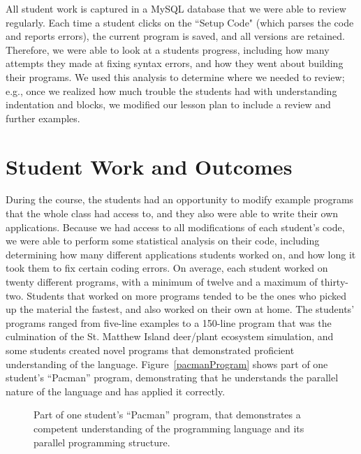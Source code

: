 \documentclass{sig-alternate}
\newcommand{\INDSTATE}[1][1]{\STATE\hspace{#1\algorithmicindent}}
\begin{document}
All student work is captured in a MySQL database that we were able to review regularly.  Each time
a student clicks on the ``Setup Code" (which parses the code and reports errors), the current
program is saved, and all versions are retained.  Therefore, we were able to look at a students 
progress, including how many attempts they made at fixing syntax errors, and how they went about
building their programs.  We used this analysis to determine where we needed to review; e.g.,
once we realized how much trouble the students had with understanding indentation and blocks, we
modified our lesson plan to include a review and further examples.

\section{Student Work and Outcomes}
During the course, the students had an opportunity to modify example programs that the whole
class had access to, and they also were able to write their own applications.  Because we 
had access to all modifications of each student's code, we were able to perform some
statistical analysis on their code, including determining how many different applications 
students worked on, and how long it took them to fix certain coding errors.  On average, 
each student worked on twenty different programs, with a minimum of twelve and a maximum
of thirty-two.  Students that worked on more programs tended to be the ones who picked up
the material the fastest, and also worked on their own at home.  The students' programs ranged 
from five-line examples to a 150-line program that 
was the culmination of the St. Matthew Island deer/plant ecosystem simulation, and some students
created novel programs that demonstrated proficient understanding of the language.  
Figure~\ref{pacmanProgram} shows part of one student's ``Pacman'' program, demonstrating that
he understands the parallel nature of the language and has applied it correctly.

\begin{figure}
\begin{algorithmic}[1]
  \INDSTATE{for each pacman}
    \INDSTATE[2]{do in any order}
      \INDSTATE[3]{move the pacman's position a random number between 10 and 50 right}
      \INDSTATE[3]{move the pacman's position a random number between 10 and 50 left}
      \INDSTATE[3]{move the pacman's position a random number between 10 and 50 up}
      \INDSTATE[3]{move the pacman's position a random number between 10 and 50 down}

  \INDSTATE{destroy the pacman}

\end{algorithmic} 
\caption{Part of one student's ``Pacman'' program, that demonstrates a competent understanding
of the programming language and its parallel programming structure.}
\label{fig:pacmanProgram} 
\end{figure}
\end{document}
